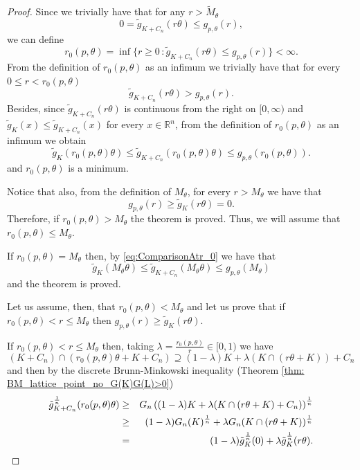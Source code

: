 \documentclass[10pt]{amsart}
\def\R{\mathbb{R}}
\numberwithin{equation}{section}
\begin{document}
\begin{proof}
Since we trivially have that for any $r>\tilde{M}_\theta$
$$
0=\tilde{g}_{K+C_n}(r\theta)\leq g_{p,\theta}(r),
$$
we can define
$$
r_0(p,\theta)=\inf\{r\geq0\,:\tilde{g}_{K+C_n}(r\theta)\leq g_{p,\theta}(r)\}<\infty.
$$
From the definition of $r_0(p,\theta)$ as an infimum we trivially have that for every $0\leq r<r_0(p,\theta)$
$$
\tilde{g}_{K+C_n}(r\theta)> g_{p,\theta}(r).
$$
Besides, since $\tilde{g}_{K+C_n}(r\theta)$ is continuous from the right on $[0,\infty)$ and $\tilde{g}_K(x)\leq\tilde{g}_{K+C_n}(x)$ for every $x\in\R^n$, from the definition of $r_0(p,\theta)$ as an infimum we obtain
\begin{equation}\label{eq:ComparisonAtr_0}
\tilde{g}_{K}(r_0(p,\theta)\theta)\leq\tilde{g}_{K+C_n}(r_0(p,\theta)\theta)\leq g_{p,\theta}(r_0(p,\theta)).
\end{equation}
and $r_0(p,\theta)$ is a minimum.

Notice that also, from the definition of $M_\theta$, for every $r>M_\theta$ we have that
$$
g_{p,\theta}(r)\geq \tilde{g}_K(r\theta)=0.
$$
Therefore, if $r_0(p,\theta)> M_\theta$ the theorem is proved. Thus, we will assume that $r_0(p,\theta)\leq M_\theta$.

If $r_0(p,\theta)= M_\theta$ then, by \eqref{eq:ComparisonAtr_0} we have that
$$
\tilde{g}_{K}(M_\theta\theta)\leq\tilde{g}_{K+C_n}(M_\theta\theta)\leq g_{p,\theta}(M_\theta)
$$
and the theorem is proved.

Let us assume, then, that $r_0(p,\theta)<M_\theta$ and let us prove that if $r_0(p,\theta)< r\leq M_\theta$ then $g_{p,\theta}(r)\geq \tilde{g}_K(r\theta)$.

If $r_0(p,\theta)<r\leq M_\theta$ then, taking $\lambda=\frac{r_0(p,\theta)}{r}\in[0,1)$ we have
$$
(K+C_n)\cap(r_0(p,\theta)\theta+K+C_n)\supseteq (1-\lambda) K+\lambda (K\cap(r\theta+K))+C_n
$$
and then by the discrete Brunn-Minkowski inequality (Theorem \ref{thm: BM_lattice_point_no_G(K)G(L)>0})
\begin{eqnarray*}
\tilde{g}_{K+C_n}^\frac{1}{n}(r_0(p,\theta)\theta)&\geq& G_n\left((1-\lambda) K+\lambda (K\cap(r\theta+K)+C_n)\right)^\frac{1}{n}\cr
&\geq&(1-\lambda)G_n(K)^\frac{1}{n}+\lambda G_n(K\cap(r\theta+K))^\frac{1}{n}\cr
&=&(1-\lambda)\tilde{g}_K^\frac{1}{n}(0)+\lambda \tilde{g}_K^\frac{1}{n}(r\theta).\cr
\end{eqnarray*}


\end{proof}
\end{document}
